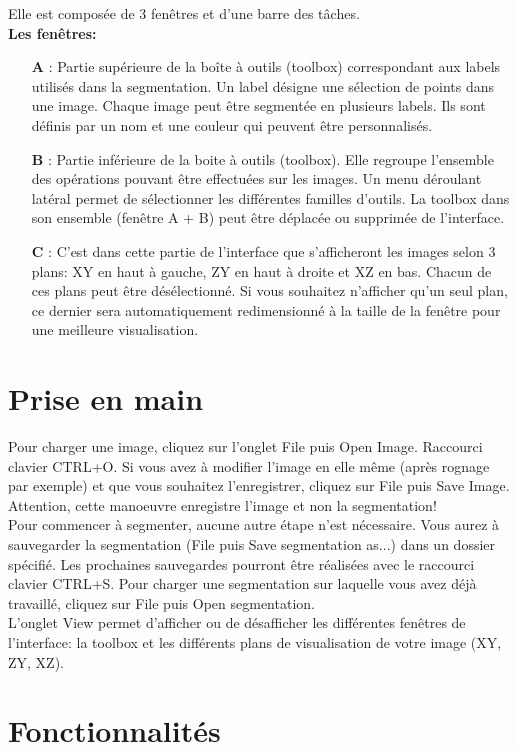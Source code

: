 \documentclass {article}
\begin{document}
Elle est composée de 3 fenêtres et d'une barre des tâches.
\\
\textbf{Les fenêtres:}
\begin{itemize}
	\item[\textbf{A}]: Partie supérieure de la boîte à outils (toolbox) correspondant aux labels utilisés dans la segmentation. Un label désigne une sélection de points dans une image. Chaque image peut être segmentée en plusieurs labels. Ils sont définis par un nom et une couleur qui peuvent être personnalisés.
	\item[\textbf{B}]: Partie inférieure de la boite à outils (toolbox). Elle regroupe l'ensemble des opérations pouvant être effectuées sur les images. Un menu déroulant latéral permet de sélectionner les différentes familles d'outils. La toolbox dans son ensemble (fenêtre A + B) peut être déplacée ou supprimée de l'interface.
	\item[\textbf{C}]: C'est dans cette partie de l'interface que s'afficheront les images selon 3 plans: XY en haut à gauche, ZY en haut à droite et XZ en bas. Chacun de ces plans peut être désélectionné. Si vous souhaitez n'afficher qu'un seul plan, ce dernier sera automatiquement redimensionné à la taille de la fenêtre pour une meilleure visualisation.
\end{itemize}


\part{Prise en main}

Pour charger une image, cliquez sur l'onglet File puis Open Image. Raccourci clavier CTRL+O. Si vous avez à modifier l'image en elle même (après rognage par exemple) et que vous souhaitez l'enregistrer, cliquez sur File puis Save Image. Attention, cette manoeuvre enregistre l'image et non la segmentation!
\\
Pour commencer à segmenter, aucune autre étape n'est nécessaire. Vous aurez à sauvegarder la segmentation (File puis Save segmentation as...) dans un dossier spécifié. Les prochaines sauvegardes pourront être réalisées avec le raccourci clavier CTRL+S. Pour charger une segmentation sur laquelle vous avez déjà travaillé, cliquez sur File puis Open segmentation.
\\
L'onglet View permet d'afficher ou de désafficher les différentes fenêtres de l'interface: la toolbox et les différents plans de visualisation de votre image (XY, ZY, XZ).

\part{Fonctionnalités}
\end{document}
